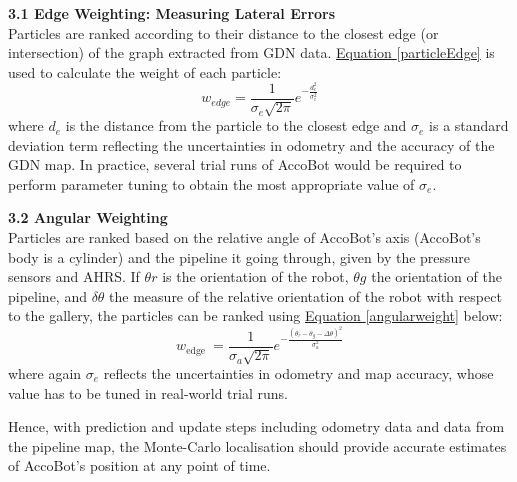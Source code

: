 \documentclass[11pt]{article}		%
\newcommand{\equationref}[1]{\hyperref[#1]{Equation \ref*{#1}}}     %
\begin{document}
    \textbf{3.1 Edge Weighting: Measuring Lateral Errors}
    \\Particles are ranked according to their distance to the closest edge (or intersection) of the graph extracted from GDN data. \equationref{particleEdge} is used to calculate the weight of each particle:
    \begin{equation}
w_{e d g e}=\frac{1}{\sigma_{e} \sqrt{2 \pi}} e^{-\frac{d_{e}^{2}}{\sigma_{e}^{2}}} \label{particleEdge}
\end{equation}
    where $d_e$ is the distance from the particle to the closest edge and $\sigma_e$ is a standard deviation term reflecting the uncertainties in odometry and the accuracy of the GDN map. In practice, several trial runs of AccoBot would be required to perform parameter tuning to obtain the most appropriate value of $\sigma_e$.
    
    \textbf{3.2 Angular Weighting}
    \\Particles are ranked based on the relative angle of AccoBot's axis (AccoBot's body is a cylinder) and the pipeline it going through, given by the pressure sensors and AHRS. If $\theta r$ is the orientation of the robot, $\theta g$ the orientation of the pipeline, and $\delta \theta$ the measure of the relative orientation of the robot with respect to the gallery, the particles can be ranked using \equationref{angularweight} below:
    \begin{equation}
w_{\text {edge }}=\frac{1}{\sigma_{a} \sqrt{2 \pi}} e^{-\frac{\left(\theta_{r}-\theta_{g}-\Delta \theta\right)^{2}}{\sigma_{a}^{2}}}\label{angularweight}
\end{equation}
	 where again $\sigma_e$ reflects the uncertainties in odometry and map accuracy, whose value has to be tuned in real-world trial runs. 
	 
	 Hence, with prediction and update steps including odometry data and data from the pipeline map, the Monte-Carlo localisation should provide accurate estimates of AccoBot's position at any point of time.
	 
\end{document}
